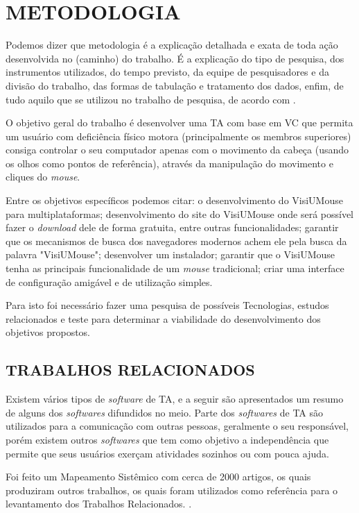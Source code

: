 \chapter{METODOLOGIA}\label{CAP3}

Podemos dizer que metodologia é a explicação detalhada e exata de toda ação desenvolvida no (caminho) do trabalho. É a explicação do tipo de pesquisa, dos instrumentos utilizados, do tempo previsto, da equipe de pesquisadores e da divisão do trabalho, das formas de tabulação e tratamento dos dados, enfim, de tudo aquilo que se utilizou no trabalho de pesquisa, de acordo com .

O objetivo geral do trabalho é desenvolver uma TA com base em VC que permita um usuário com deficiência físico motora (principalmente os membros superiores) consiga controlar o seu computador apenas com o movimento da cabeça (usando os olhos como pontos de referência), através da manipulação do movimento e cliques do \textit{mouse}.

Entre os objetivos específicos podemos citar: o desenvolvimento do VisiUMouse para multiplataformas; desenvolvimento do site do VisiUMouse onde será possível fazer o \textit{download} dele de forma gratuita, entre outras funcionalidades; garantir que os mecanismos de busca dos navegadores modernos achem ele pela busca da palavra "VisiUMouse"; desenvolver um instalador; garantir que o VisiUMouse tenha as principais funcionalidade de um \textit{mouse} tradicional; criar uma interface de configuração amigável e de utilização simples.

Para isto foi necessário fazer uma pesquisa de possíveis Tecnologias, estudos relacionados e teste para determinar a viabilidade do desenvolvimento dos objetivos propostos.
    
\section{TRABALHOS RELACIONADOS}\label{Sub:trabalhos-relacionados}
Existem vários tipos de  \textit{software} de TA, e a seguir são apresentados um resumo de alguns dos \textit{softwares} difundidos no meio. Parte dos \textit{softwares} de TA são utilizados para a comunicação com outras pessoas, geralmente o seu responsável, porém existem outros \textit{softwares} que tem como objetivo a independência que permite que seus usuários exerçam atividades sozinhos ou com pouca ajuda.

Foi feito um Mapeamento Sistêmico com cerca de 2000 artigos, os quais produziram outros trabalhos, os quais foram utilizados como referência para o levantamento dos Trabalhos Relacionados. \cite{da2018best-UPPERCASE}.

